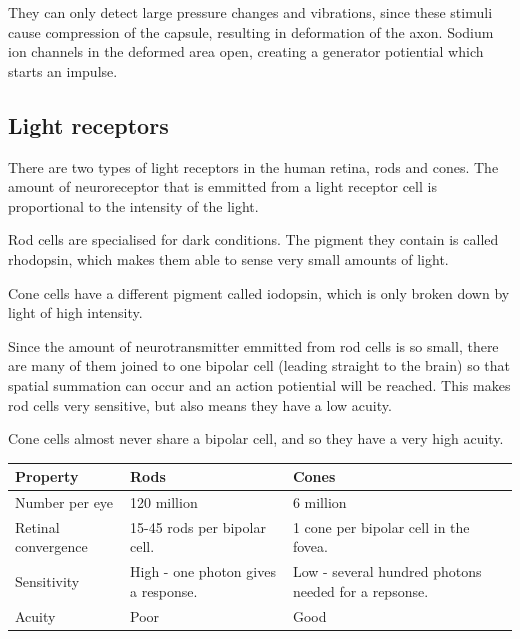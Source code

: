 \documentclass{article}
\begin{document}
They can only detect large pressure changes and vibrations, since these stimuli
cause compression of the capsule, resulting in deformation of the axon. Sodium
ion channels in the deformed area open, creating a generator potiential which
starts an impulse.

\subsection*{Light receptors}

There are two types of light receptors in the human retina, rods and cones. The
amount of neuroreceptor that is emmitted from a light receptor cell is
proportional to the intensity of the light.

Rod cells are specialised for dark conditions. The pigment they contain is
called rhodopsin, which makes them able to sense very small amounts of light.

Cone cells have a different pigment called iodopsin, which is only broken down
by light of high intensity.

Since the amount of neurotransmitter emmitted from rod cells is so small, there
are many of them joined to one bipolar cell (leading straight to the brain) so
that spatial summation can occur and an action potiential will be reached. This
makes rod cells very sensitive, but also means they have a low acuity.

Cone cells almost never share a bipolar cell, and so they have a very high
acuity.

\begin{center}

	\begin{tabular}{|l|p{3.8cm}|p{3.8cm}|}

		\hline

		Property & Rods & Cones \\ \hline

		Number per eye & 120 million & 6 million\\ \hline

		Retinal convergence & 15-45 rods per bipolar cell. & 1 cone per bipolar
		cell in the fovea.\\ \hline

		Sensitivity & High - one photon gives a response. & Low - several
		hundred photons needed for a repsonse.\\ \hline

		Acuity & Poor & Good \\ \hline

	\end{tabular}

\end{center}
\end{document}
